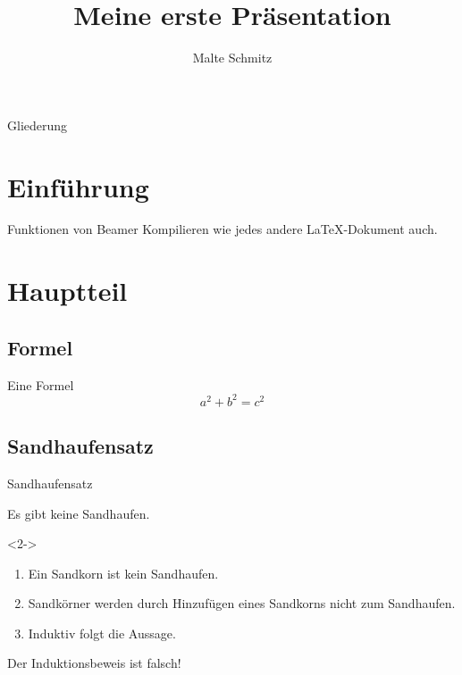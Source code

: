 \documentclass{beamer}
\title{Meine erste Präsentation}
\author{Malte Schmitz}
\begin{document}
  \begin{frame}
    \maketitle
  \end{frame}

  \begin{frame}{Gliederung}
    \tableofcontents
  \end{frame}

  \section{Einführung}

  \begin{frame}{Funktionen von Beamer}
    Kompilieren wie jedes andere
    \LaTeX-Dokument auch.
  \end{frame}

  \section{Hauptteil}

  \subsection{Formel}

  \begin{frame}{Eine Formel}
    \[ a^2 + b^2 = c^2 \]
  \end{frame}

  \subsection{Sandhaufensatz}

  \begin{frame}{Sandhaufensatz}
    \begin{Satz}[Sandhaufensatz]
      Es gibt keine Sandhaufen.
    \end{Satz}

    \begin{Beweis}<2->
      \begin{enumerate}
        \item<3-> Ein Sandkorn ist kein Sandhaufen.
        \item<4-> Sandkörner werden durch Hinzufügen eines Sandkorns nicht zum Sandhaufen.
        \item Induktiv folgt die Aussage. \qedhere
      \end{enumerate}
      \end{Beweis}
    Der Induktionsbeweis ist \alert<6>{falsch}!
  \end{frame}
\end{document}
